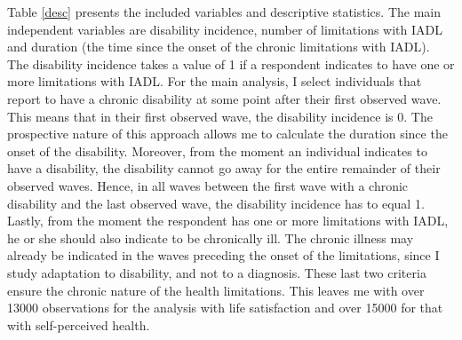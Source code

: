 \documentclass[12pt]{article}
\begin{document}
Table \ref{desc} presents the included variables and descriptive statistics. The main independent variables are disability incidence, number of limitations with IADL and duration (the time since the onset of the chronic limitations with IADL). The disability incidence takes a value of 1 if a respondent indicates to have one or more limitations with IADL. For the main analysis, I select individuals that report to have a chronic disability at some point after their first observed wave. This means that in their first observed wave, the disability incidence is 0. The prospective nature of this approach allows me to calculate the duration since the onset of the disability. Moreover, from the moment an individual indicates to have a disability, the disability cannot go away for the entire remainder of their observed waves. Hence, in all waves between the first wave with a chronic disability and the last observed wave, the disability incidence has to equal 1. Lastly, from the moment the respondent has one or more limitations with IADL, he or she should also indicate to be chronically ill. The chronic illness may already be indicated in the waves preceding the onset of the limitations, since I study adaptation to disability, and not to a diagnosis. These last two criteria ensure the chronic nature of the health limitations. This leaves me with over 13000 observations for the analysis with life satisfaction and over 15000 for that with self-perceived health.

\end{document}
